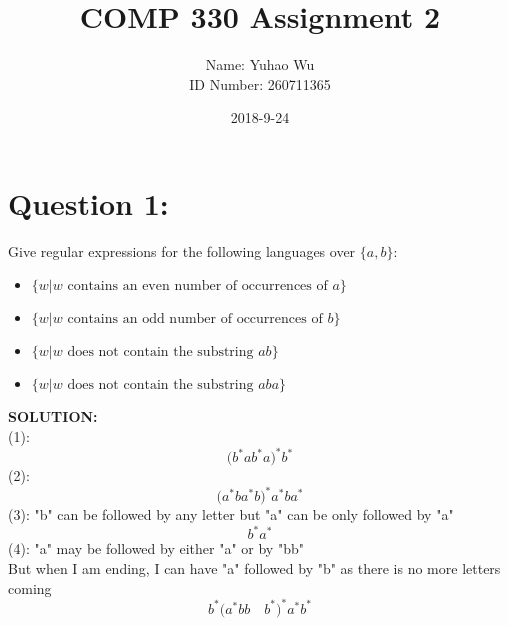 \documentclass [9 pt]{article}
\theoremstyle{definition}
\begin{document}
\title{COMP 330 Assignment 2}
\date{2018-9-24}
\author{Name: Yuhao Wu\\
ID Number: 260711365
}
\maketitle


\section*{Question 1:}
Give regular expressions for the following languages over $\{a, b\}$:
\begin{itemize}
	\item  $\{w|w \text{ contains an even number of occurrences of } a\}$
	\item $\{w|w \text{ contains an odd number of occurrences of } b\}$
	\item $\{w|w \text{ does not contain the substring } ab\}$
	\item $\{w|w \text{ does not contain the substring } aba\}$
\end{itemize}
\textbf{SOLUTION:} \\
(1):$$\bigg( b^* a b^* a \bigg)^*b^* $$
(2):$$ \bigg( a^*ba^*b \bigg)^* a^* b a^* $$
(3): "b" can be followed by any letter but "a" can be only followed by "a"
$$b^* a^*$$
(4): "a" may be followed by either  "a" or by "bb"\\
But when I am ending, I can have "a" followed by "b" as there is no more letters coming
$$ b^* \bigg(a^*bb\quad b^*\bigg)^* a^* b^*$$











\newpage
\end{document}
